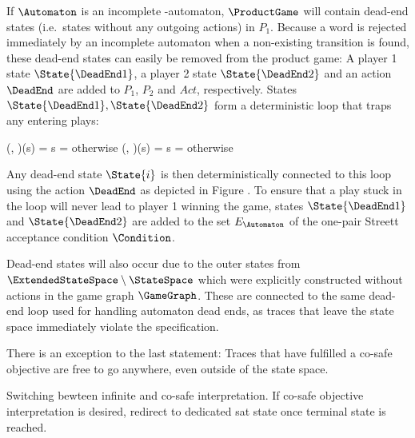 \startsubsection[title={Dead-end States}]


    If $\Automaton$ is an incomplete \omega-automaton, $\ProductGame$ will contain dead-end states (i.e.\ states without any outgoing actions) in $P_1$.
    Because a word is rejected immediately by an incomplete automaton when a non-existing transition is found, these dead-end states can easily be removed from the product game:
    A player 1 state $\State{\DeadEnd1}$, a player 2 state $\State{\DeadEnd2}$ and an action $\DeadEnd$ are added to $P_1$, $P_2$ and $Act$, respectively.
    States $\State{\DeadEnd1}, \State{\DeadEnd2}$ form a deterministic loop that traps any entering plays:

    \startformula
        \startalign[n=2,align={right,left}]
            \NC \Transition(, \DeadEnd)(s) =
            \NC \startmathcases
                    \MC \StartIf s = 
                    \NR
                    \NC otherwise
                    \NR
                \stopmathcases
            \NR
            \NC \Transition(, \DeadEnd)(s) =
            \NC \startmathcases
                    \MC \StartIf s = 
                    \NR
                    \NC otherwise
                    \NR
                \stopmathcases
            \NR
        \stopalign
    \stopformula

    Any dead-end state $\State{i}$ is then deterministically connected to this loop using the action $\DeadEnd$ as depicted in Figure .
    To ensure that a play stuck in the loop will never lead to player 1 winning the game, states $\State{\DeadEnd1}$ and $\State{\DeadEnd2}$ are added to the set $E_\Automaton$ of the one-pair Streett acceptance condition $\Condition$.

    Dead-end states will also occur due to the outer states from $\ExtendedStateSpace \setminus \StateSpace$ which were explicitly constructed without actions in the game graph $\GameGraph$.
    These are connected to the same dead-end loop used for handling automaton dead ends, as traces that leave the state space immediately violate the specification.

\stopsubsection


\startsubsection[title={Co-safe Interpretation}]

    There is an exception to the last statement:
    Traces that have fulfilled a co-safe objective are free to go anywhere, even outside of the state space.

    Switching bewteen infinite and co-safe interpretation.
    If co-safe objective interpretation is desired, redirect to dedicated sat state once terminal state is reached.

\stopsubsection

